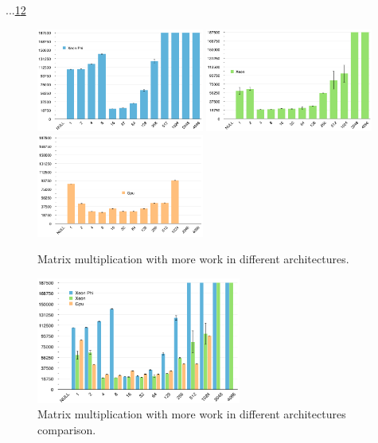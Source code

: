\par{...\ref{MoreWork}\ref{MoreWorkComp}}

\begin{figure}[!h]
    \centering
    \includegraphics[width=0.49\textwidth]{figures/opt1_phi.png}
    \includegraphics[width=0.49\textwidth]{figures/opt1_cpu.png}
    \includegraphics[width=0.49\textwidth]{figures/opt1_gpu.png}
    \caption{Matrix multiplication with more work in different architectures.}
    \label{MoreWork}
\end{figure}

\begin{figure}[!h]
    \centering
    \includegraphics[width=0.6\textwidth]{figures/opt1_comp.png}
    \caption{Matrix multiplication with more work in different architectures comparison.}
    \label{MoreWorkComp}
\end{figure}

